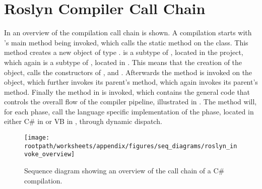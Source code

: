\chapter[]{Roslyn Compiler Call Chain}
In  an overview of the compilation call chain is shown. A compilation starts with 's main method being invoked, which calls the static  method on the  class. This method creates a new  object of type .  is a subtype of , located in the  project, which again is a subtype of , located in . This means that the creation of the  object, calls the constructors of ,  and . Afterwards the  method is invoked on the  object, which further invokes its parent's  method, which again invokes its parent's  method. Finally the  method in  is invoked, which contains the general code that controls the overall flow of the compiler pipeline, illustrated in . The  method will, for each phase, call the language specific implementation of the phase, located in either C\# in  or \ac{VB} in , through dynamic dispatch.
\label{app:roslyn_call_chain}
\begin{sidewaysfigure}[htbp]
\centering
\texttt{[image: \\rootpath/worksheets/appendix/figures/seq\_diagrams/roslyn\_invoke\_overview]}
\caption{Sequence diagram showing an overview of the call chain of a C\# compilation.}
\label{fig:roslyn_invoke_overview}
\end{sidewaysfigure}
